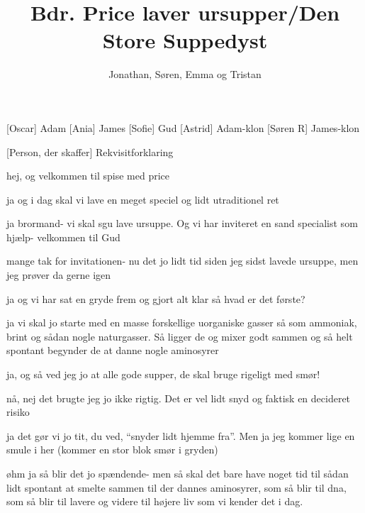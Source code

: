 \documentclass[a4paper,11pt]{article}
\title{Bdr. Price laver ursupper/Den Store Suppedyst}
\author{Jonathan, Søren, Emma og Tristan}
\begin{document}
\maketitle

\begin{roles}
   [Oscar] Adam
[Ania] James
[Sofie] Gud
[Astrid] Adam-klon
[Søren R] James-klon

\end{roles}

\begin{props}
    [Person, der skaffer] Rekvisitforklaring
\end{props}


\begin{sketch}



 hej, og velkommen til spise med price


 ja og i dag skal vi lave en meget speciel og lidt utraditionel ret

 ja brormand- vi skal sgu lave ursuppe. Og vi har inviteret en sand specialist som hjælp- velkommen til Gud

 mange tak for invitationen- nu det jo lidt tid siden jeg sidst lavede ursuppe, men jeg prøver da gerne igen

 ja og vi har sat en gryde frem og gjort alt klar så hvad er det første?

 ja vi skal jo starte med en masse forskellige uorganiske gasser så som ammoniak, brint og sådan nogle naturgasser. Så ligger de og mixer godt sammen og så helt spontant begynder de at danne nogle aminosyrer

 ja, og så ved jeg jo at alle gode supper, de skal bruge rigeligt med smør!

 nå, nej det brugte jeg jo ikke rigtig. Det er vel lidt snyd og faktisk en decideret risiko

 ja det gør vi jo tit, du ved, “snyder lidt hjemme fra”. Men ja jeg kommer lige en smule i her (kommer en stor blok smør i gryden)

 øhm ja så blir det jo spændende- men så skal det bare have noget tid til sådan lidt spontant at smelte sammen til der dannes aminosyrer, som så blir til dna, som så blir til lavere og videre til højere liv som vi kender det i dag. 


\end{sketch}
\end{document}
